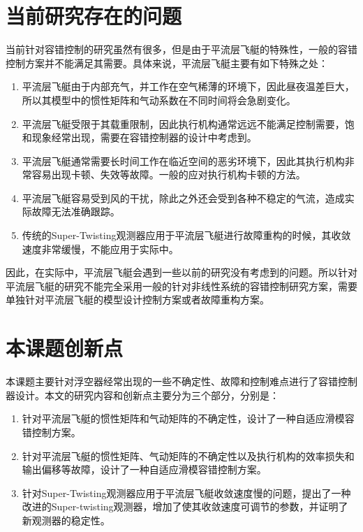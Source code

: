 \section{当前研究存在的问题}
当前针对容错控制的研究虽然有很多，但是由于平流层飞艇的特殊性，一般的容错控制方案并不能满足其需要。具体来说，平流层飞艇主要有如下特殊之处：
\begin{enumerate}
  \item 平流层飞艇由于内部充气，并工作在空气稀薄的环境下，因此昼夜温差巨大，所以其模型中的惯性矩阵和气动系数在不同时间将会急剧变化。
  \item 平流层飞艇受限于其载重限制，因此执行机构通常远远不能满足控制需要，饱和现象经常出现，需要在容错控制器的设计中考虑到。
  \item 平流层飞艇通常需要长时间工作在临近空间的恶劣环境下\cite{fenggui2013}，因此其执行机构非常容易出现卡顿、失效等故障。一般的应对执行机构卡顿的方法。
  \item 平流层飞艇容易受到风的干扰，除此之外还会受到各种不稳定的气流，造成实际故障无法准确跟踪。
  \item 传统的Super-Twisting观测器应用于平流层飞艇进行故障重构的时候，其收敛速度非常缓慢，不能应用于实际中。
\end{enumerate}
因此，在实际中，平流层飞艇会遇到一些以前的研究没有考虑到的问题。所以针对平流层飞艇的研究不能完全采用一般的针对非线性系统的容错控制研究方案，需要单独针对平流层飞艇的模型设计控制方案或者故障重构方案。

\section{本课题创新点}
本课题主要针对浮空器经常出现的一些不确定性、故障和控制难点进行了容错控制器设计。本文的研究内容和创新点主要分为三个部分，分别是：
\begin{enumerate}
    \item 针对平流层飞艇的惯性矩阵和气动矩阵的不确定性，设计了一种自适应滑模容错控制方案。
    \item 针对平流层飞艇的惯性矩阵、气动矩阵的不确定性以及执行机构的效率损失和输出偏移等故障，设计了一种自适应滑模容错控制方案。
    \item 针对Super-Twisting观测器应用于平流层飞艇收敛速度慢的问题，提出了一种改进的Super-twisting观测器，增加了使其收敛速度可调节的参数，并证明了新观测器的稳定性。
\end{enumerate}
